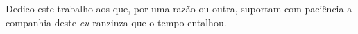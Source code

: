 
\chapter*{}
\vspace{15cm}
\begin{flushright}
	Dedico este trabalho aos que, por uma razão ou outra, suportam com paciência a companhia deste \textit{eu} ranzinza que o tempo entalhou.
\end{flushright}
